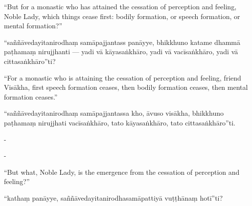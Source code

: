 \begin{samepage}
\begin{leftcolumn*}
“But for a monastic who has attained the cessation of perception and feeling, Noble Lady, which things cease first: bodily formation, or speech formation, or mental formation?”
\end{leftcolumn*}

\begin{rightcolumn}
“saññāvedayitanirodhaṃ samāpajjantass panāyye, bhikkhuno katame dhammā paṭhamaṃ nirujjhanti — yadi vā kāyasaṅkhāro, yadi vā vacīsaṅkhāro, yadi vā cittasaṅkhāro”ti?
\end{rightcolumn}
\end{samepage}

\begin{samepage}
\begin{leftcolumn*}
“For a monastic who is attaining the cessation of perception and feeling, friend Visākha, first speech formation ceases, then bodily formation ceases, then mental formation ceases.”
\end{leftcolumn*}

\begin{rightcolumn}
“saññāvedayitanirodhaṃ samāpajjantassa kho, āvuso visākha, bhikkhuno paṭhamaṃ nirujjhati vacīsaṅkhāro, tato kāyasaṅkhāro, tato cittasaṅkhāro”ti.
\end{rightcolumn}
\end{samepage}

\begin{samepage}
\begin{leftcolumn*}
-
\end{leftcolumn*}

\begin{rightcolumn}
-
\end{rightcolumn}
\end{samepage}

\begin{samepage}
\begin{leftcolumn*}
“But what, Noble Lady, is the emergence from the cessation of perception and feeling?”
\end{leftcolumn*}

\begin{rightcolumn}
“kathaṃ panāyye, saññāvedayitanirodhasamāpattiyā vuṭṭhānaṃ hotī”ti?
\end{rightcolumn}
\end{samepage}

